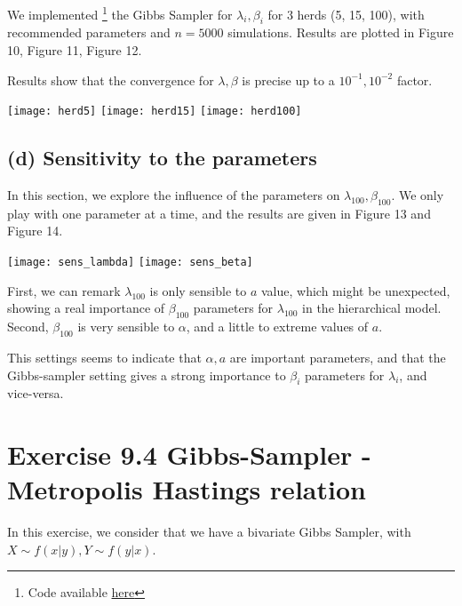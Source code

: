 \documentclass{article}
\begin{document}
We implemented \footnote{Code available \href{https://github.com/sally14/ComputationalStats/blob/master/TD3/gibbs_mastitis.ipynb}{here}} 
the Gibbs Sampler for $\lambda_i, \beta_i$ for $3$ herds (5, 15, 100), with recommended parameters
and $n=5000$ simulations. 
Results are plotted in Figure 10, Figure 11, Figure 12. 

Results show that the convergence for $\lambda, \beta$
is precise up to a $10^{-1} , 10^{-2}$ factor. 

\begin{center}
    \texttt{[image: herd5]}
    \vspace{2cm}
    \texttt{[image: herd15]}
    \texttt{[image: herd100]}
\end{center}

\newpage
\subsection*{(d) Sensitivity to the parameters}
In this section, we explore the influence of the parameters 
on $\lambda_{100}, \beta_{100}$. We only play with one parameter at a time, 
and the results are given in Figure 13 and Figure 14.
\begin{center}
    \begin{multicols}{2}
        \texttt{[image: sens\_lambda]}
        \vspace{0.5cm}
        \texttt{[image: sens\_beta]}
    \end{multicols}
\end{center}

First, we can remark $\lambda_{100}$ is only sensible to $a$ value,
 which might be unexpected, showing a real importance of $\beta_{100}$ 
 parameters
 for $\lambda_{100}$ in the hierarchical model. Second, $\beta_{100}$ 
 is very sensible to $\alpha$, and a little to extreme values of $a$.

This settings seems to indicate that $\alpha, a$ are important parameters, 
and that the Gibbs-sampler setting gives a strong importance to $\beta_i$ parameters
for $\lambda_i$, and vice-versa.

\section*{Exercise 9.4 Gibbs-Sampler - Metropolis Hastings relation}
In this exercise, we consider that we have a bivariate Gibbs Sampler, with 
$X \sim f(x|y), Y\sim f(y|x)$. 
\end{document}
